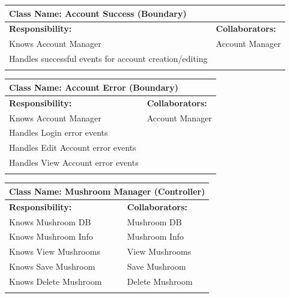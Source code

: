 \documentclass[]{article}
\begin{document}
\begin{itemize}
        \begin{table}[ht]
		\centering
		\begin{tabular}{|p{6cm}|p{6cm}|}
		\hline 
		\multicolumn{2}{|l|}{\textbf{Class Name: Account Success (Boundary)}} \\
		\hline
		\textbf{Responsibility:} & \textbf{Collaborators:} \\
		\hline
		Knows Account Manager & Account Manager\\
            Handles successful events for account creation/editing & \\
		\vspace{1in} & \\
		\hline
		\end{tabular}
	\end{table}

        \begin{table}[ht]
		\centering
		\begin{tabular}{|p{6cm}|p{6cm}|}
		\hline 
		\multicolumn{2}{|l|}{\textbf{Class Name: Account Error (Boundary)}} \\
		\hline
		\textbf{Responsibility:} & \textbf{Collaborators:} \\
		\hline
		Knows Account Manager & Account Manager\\
            Handles Login error events &  \\
            Handles Edit Account error events & \\
            Handles View Account error events &  \\
		\vspace{1in} & \\
		\hline
		\end{tabular}
	\end{table}

     \begin{table}[ht]
		\centering
		\begin{tabular}{|p{6cm}|p{6cm}|}
		\hline 
		\multicolumn{2}{|l|}{\textbf{Class Name: Mushroom Manager (Controller)}} \\
		\hline
		\textbf{Responsibility:} & \textbf{Collaborators:} \\
		\hline
            Knows Mushroom DB & Mushroom DB\\
		Knows Mushroom Info & Mushroom Info\\
		Knows View Mushrooms & View Mushrooms\\
            Knows Save Mushroom & Save Mushroom\\
		Knows Delete Mushroom & Delete Mushroom\\
		\vspace{1in} & \\
		\hline
		\end{tabular}
	\end{table}


\end{itemize}
\end{document}

